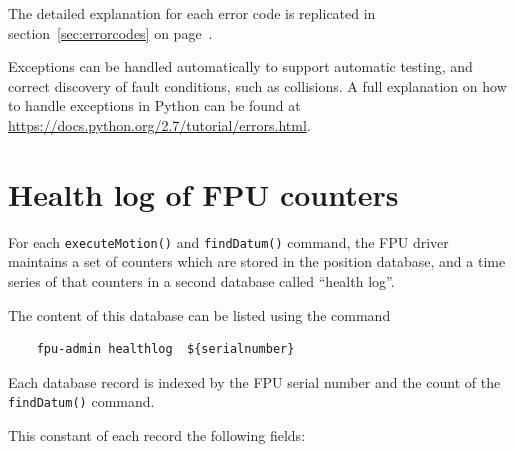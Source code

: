 \documentclass[11pt,a4paper]{scrartcl}
\begin{document}
The detailed explanation for each error code is replicated in
section~\ref{sec:errorcodes} on page~\pageref{sec:errorcodes}.

Exceptions can be handled automatically to support automatic
testing, and correct discovery of fault conditions, such as
collisions. A full explanation on how to handle exceptions in Python can
be found at \url{https://docs.python.org/2.7/tutorial/errors.html}.

\section{Health log of FPU counters}
\label{sec:healthlog}

For each \texttt{executeMotion()} and \texttt{findDatum()} command,
the FPU driver maintains a set of counters which are stored in the
position database, and a time series of that counters in a second
database called ``health log''.

The content of this database can be listed using the command

\begin{verbatim}
    fpu-admin healthlog  ${serialnumber}
\end{verbatim}

Each database record is indexed by the FPU serial number and the count
of the \texttt{findDatum()} command.

This constant of each record the following fields:
\end{document}
